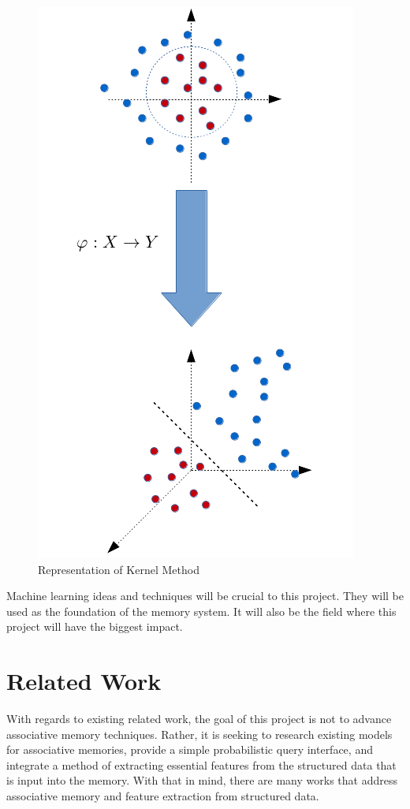 \documentclass{sig-alternate}
\begin{document}
\begin{figure}[h]
	\begin{center}
		\includegraphics[width=0.75\linewidth]{kernelmeth}
	\end{center}
	\vspace{-12pt}
	\caption{Representation of Kernel Method}
	\label{fig:kernelmeth}
\end{figure}

Machine learning ideas and techniques will be crucial to this project. 
They will be used as the foundation of the memory system. It will also be the field where this 
project will have the biggest impact.


\section{Related Work}
\label{sec:related_work}

With regards to existing related work, the goal of this project is not to advance associative memory 
techniques. Rather, it is seeking to research existing models for associative memories, provide a 
simple probabilistic query interface, and integrate a method of extracting essential features from 
the structured data that is input into the memory. With that in mind, there are many works that 
address associative memory and feature extraction from structured data.
\end{document}
